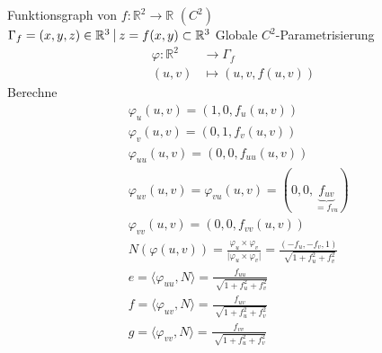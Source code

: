 \documentclass[../main.tex]{subfiles}
\begin{document}
\begin{example}
    Funktionsgraph von $f: \mathbb{R}^{2} \rightarrow \mathbb{R}$ $(C^{2})$\\
    $\Gamma_{f} = {(x,y,z)\in\mathbb{R}^{3} \ \vline \ z = f(x,y)} \subset \mathbb{R}^{3}$ Globale $C^{2}$-Parametrisierung \begin{align*}
        \varphi:\mathbb{R}^{2} &\rightarrow \Gamma_{f}\\
        (u,v) &\mapsto (u,v,f(u,v))
    \end{align*}
    Berechne 
    \begin{align*}
        &\varphi_{u}(u,v) = (1, 0, f_{u}(u,v))\\
        &\varphi_{v}(u,v) = (0, 1, f_{v}(u,v))\\
        &\varphi_{uu}(u,v) = (0, 0, f_{uu}(u,v))\\
        &\varphi_{uv}(u,v) = \varphi_{vu}(u,v) = (0, 0, \underbrace{f_{uv}}_{=f_{vu}})\\
        &\varphi_{vv}(u,v) = (0, 0, f_{vv}(u,v))\\
        &N(\varphi(u,v)) = \frac{\varphi_{u}\times\varphi_{v}}{\lvert\varphi_{u}\times\varphi_{v}\rvert} = \frac{(-f_{u}, -f_{v}, 1)}{\sqrt[]{1 + f_{u}^{2}+f_{v}^{2}}}\\
        &e = \langle \varphi_{uu}, N \rangle = \frac{f_{uu}}{\sqrt[]{1 + f_{u}^{2}+f_{v}^{2}}}\\
        &f = \langle \varphi_{uv}, N \rangle = \frac{f_{uv}}{\sqrt[]{1 + f_{u}^{2}+f_{v}^{2}}}\\
        &g = \langle \varphi_{vv}, N \rangle = \frac{f_{vv}}{\sqrt[]{1 + f_{u}^{2}+f_{v}^{2}}}\\
    \end{align*}
\end{example}
\end{document}
